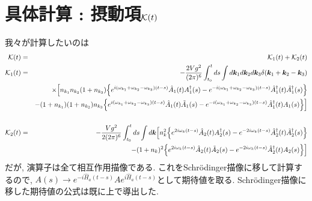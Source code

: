 \documentclass[10.5pt,a4paper]{jreport}
\newcommand{\calK}{{\cal K}}
\begin{document}
\section{具体計算 : 摂動項$\calK(t)$}
我々が計算したいのは
\begin{eqnarray}
  \calK(t) &=& \calK_1(t) + \calK_2(t)\\
\nonumber  \calK_1(t)&=& -\frac{2Vg^2}{(2\pi)^6}\int_{t_0}^tds\int d\bm{k}_1d\bm{k}_2d\bm{k}_3\delta(\bm{k}_1+\bm{k}_2-\bm{k}_3)\\
  \nonumber  &&\times\Bigl[n_{k_1}n_{k_2}(1+n_{k_3})\Bqty{ e^{i(\omega_{k_1}+\omega_{k_2}  - \omega_{k_3})(t-s)}\hat{A}_1(t)A_1^\dagger(s) - e^{-i(\omega_{k_1}+\omega_{k_2}  - \omega_{k_3})(t-s)}\hat{A}^\dagger_1(t)\tilde{A}_1^\dagger(s) }\\
    \nonumber  &&-(1+n_{k_1})(1+n_{k_2})n_{k_3}\Bqty{e^{i(\omega_{k_1}+\omega_{k_2}  - \omega_{k_3})(t-s)}\hat{A}_1(t)\tilde{A}_1(s) - e^{-i(\omega_{k_1}+\omega_{k_2}  - \omega_{k_3})(t-s)}\hat{A}^\dagger_1(t)A_1(s) }\Bigr]\\
  \\
  \nonumber  \calK_2(t) &=& -\frac{Vg^2}{2(2\pi)^6}\int_{t_0}^tds\int d\bm{k}\Bigl[ n_k^2\Bqty{e^{2i\omega_{k}(t-s)}\hat{A}_2(t)A_2^\dagger(s) - e^{-2i\omega_{k}(t-s)}\hat{A}^\dagger_2(t)\tilde{A}_2^\dagger(s)}\\
    &&-(1+n_{k})^2\Bqty{e^{2i\omega_{k}(t-s)}\hat{A}_2(t)\tilde{A}_2(s) - e^{-2i\omega_{k}(t-s)}\hat{A}^\dagger_2(t)A_2(s)}\Bigr]
\end{eqnarray}
だが, 演算子は全て相互作用描像である. これをSchr\"odinger描像に移して計算するので, $A(s)\rightarrow e^{-i\hat{H}_a(t-s)}Ae^{i\hat{H}_a(t-s)}$として期待値を取る. Schr\"odinger描像に移した期待値の公式は既に上で導出した.
\end{document}

